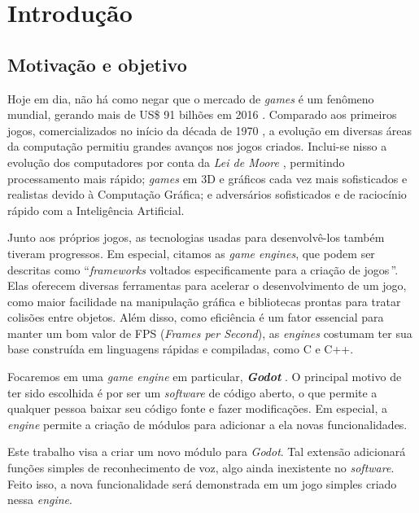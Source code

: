 \chapter{Introdução}
\label{cap:introduction}


\section{Motivação e objetivo}

Hoje em dia, não há como negar que o mercado de \textit{games} é um fenômeno mundial, gerando mais de US\$ 91 bilhões em 2016 \citep{gameMarket:16}. Comparado aos primeiros jogos, comercializados no início da década de 1970 \citep{gameMarketOrigin}, a evolução em diversas áreas da computação permitiu grandes avanços nos jogos criados. Inclui-se nisso a evolução dos computadores por conta da \textit{Lei de Moore} \citep{moore}, permitindo processamento mais rápido; \textit{games} em 3D e gráficos cada vez mais sofisticados e realistas devido à Computação Gráfica; e adversários sofisticados e de raciocínio rápido com a Inteligência Artificial.

Junto aos próprios jogos, as tecnologias usadas para desenvolvê-los também tiveram progressos. Em especial, citamos as \emph{game engines}, que podem ser descritas como \textquotedblleft \textit{frameworks} voltados especificamente para a criação de jogos\,\textquotedblright\:\citep{gameEngine:13}. Elas oferecem diversas ferramentas para acelerar o desenvolvimento de um jogo, como maior facilidade na manipulação gráfica e bibliotecas prontas para tratar colisões entre objetos. Além disso, como eficiência é um fator essencial para manter um bom valor de FPS (\textit{Frames per Second}), as \textit{engines} costumam ter sua base construída em linguagens rápidas e compiladas, como C e C++.

Focaremos em uma \textit{game engine} em particular, \textbf{\emph{Godot}} \citep{godot}. O principal motivo de ter sido escolhida é por ser um \textit{software} de código aberto, o que permite a qualquer pessoa baixar seu código fonte e fazer modificações. Em especial, a \textit{engine} permite a criação de módulos para adicionar a ela novas funcionalidades.

Este trabalho visa a criar um novo módulo para \textit{Godot}. Tal extensão adicionará funções simples de reconhecimento de voz, algo ainda inexistente no \textit{software}. Feito isso, a nova funcionalidade será demonstrada em um jogo simples criado nessa \textit{engine}.

